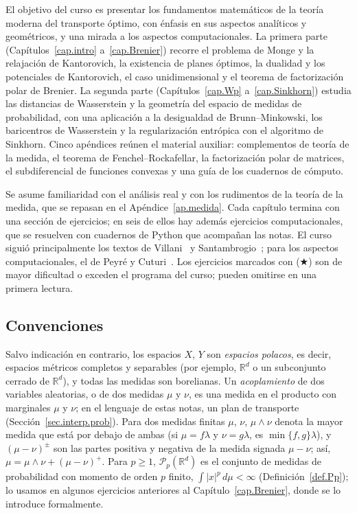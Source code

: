 \documentclass[12pt, a4paper]{amsbook}
\newcommand{\R}{{\mathbb R}}
\theoremstyle{remark}
\theoremstyle{definition}
\numberwithin{section}{chapter}
\numberwithin{subsection}{section}
\numberwithin{equation}{section}
\numberwithin{figure}{chapter}
\begin{document}
{El objetivo del curso es presentar los fundamentos matemáticos de la teoría
moderna del transporte óptimo, con énfasis en sus aspectos analíticos y
geométricos, y una mirada a los aspectos computacionales. La primera parte
(Capítulos~\ref{cap.intro} a~\ref{cap.Brenier}) recorre el problema de Monge
y la relajación de Kantorovich, la existencia de planes óptimos, la dualidad
y los potenciales de Kantorovich, el caso unidimensional y el teorema de
factorización polar de Brenier. La segunda parte (Capítulos~\ref{cap.Wp}
a~\ref{cap.Sinkhorn}) estudia las distancias de Wasserstein y la geometría
del espacio de medidas de probabilidad, con una aplicación a la desigualdad
de Brunn--Minkowski, los baricentros de Wasserstein y la regularización
entrópica con el algoritmo de Sinkhorn. Cinco apéndices reúnen el material
auxiliar: complementos de teoría de la medida, el teorema de
Fenchel--Rockafellar, la factorización polar de matrices, el subdiferencial
de funciones convexas y una guía de los cuadernos de cómputo.

Se asume familiaridad con el análisis real y con los rudimentos de la teoría
de la medida, que se repasan en el Apéndice~\ref{ap.medida}. Cada capítulo
termina con una sección de ejercicios; en seis de ellos hay además ejercicios
computacionales, que se resuelven con cuadernos de Python que acompañan las
notas. El curso siguió principalmente los textos de Villani~\cite{Villani2003}
y Santambrogio~\cite{Santambrogio}; para los aspectos computacionales, el de
Peyré y Cuturi~\cite{PeyreCuturi2019}. Los ejercicios marcados con
($\bigstar$) son de mayor dificultad o exceden el programa del curso; pueden
omitirse en una primera lectura.

\subsection*{Convenciones}

Salvo indicación en contrario, los espacios $X$, $Y$ son \emph{espacios
polacos}, es decir, espacios métricos completos y separables (por ejemplo,
$\R^d$ o un subconjunto cerrado de $\R^d$), y todas las medidas son
borelianas. Un \emph{acoplamiento} de dos variables aleatorias, o de dos
medidas $\mu$ y $\nu$, es una medida en el producto con marginales $\mu$ y
$\nu$; en el lenguaje de estas notas, un plan de transporte
(Sección~\ref{sec.interp.prob}). Para dos medidas finitas $\mu$, $\nu$,
$\mu\wedge\nu$ denota la mayor medida que está por debajo de ambas
(si $\mu=f\lambda$ y $\nu=g\lambda$, es $\min\{f,g\}\lambda$), y
$(\mu-\nu)^\pm$ son las partes positiva y negativa de la medida signada
$\mu-\nu$; así, $\mu=\mu\wedge\nu+(\mu-\nu)^+$. Para $p\ge1$,
$\mathcal P_p(\R^d)$ es el conjunto de medidas de probabilidad con momento de
orden $p$ finito, $\int|x|^p\,d\mu<\infty$ (Definición~\ref{def.Pp}); lo
usamos en algunos ejercicios anteriores al Capítulo~\ref{cap.Brenier}, donde
se lo introduce formalmente.

}
\end{document}
